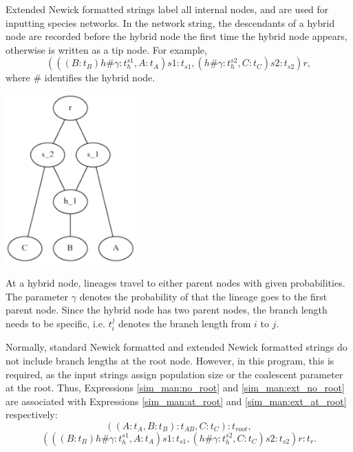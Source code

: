 Extended Newick formatted strings \citep{Cardona12008,Huson2010} label all internal
nodes, and are used for inputting species networks. In the network string, the descendants of a hybrid node are recorded before the hybrid node the first time the hybrid node appears, otherwise is written as a tip node. For example,
\begin{equation}
(((B:t_B)h\#\gamma:t^{s1}_{h},A:t_A)s1:t_{s1},(h\#\gamma:t^{s2}_{h},C:t_{C})s2:t_{s2})r,\label{sim_man:ext_no_root}
\end{equation}
where $\#$ identifies the hybrid node.
\begin{center}
\includegraphics[height=6.5cm]{net_eg.pdf}
\end{center}
At a hybrid node, lineages travel to either parent nodes with given probabilities. The parameter $\gamma$ denotes the probability of that the lineage goes to the first parent node.
Since the hybrid node has two parent nodes, the branch length needs to be specific, i.e. $t_{i}^j$ denotes the branch length from $i$ to $j$.

Normally, standard Newick formatted and extended Newick formatted strings do not include branch lengths at the root node. However, in this program, this is required, as the input strings assign population size or the coalescent parameter at the root. Thus, Expressions \eqref{sim_man:no_root} and \eqref{sim_man:ext_no_root} are associated with Expressions \eqref{sim_man:at_root} and \eqref{sim_man:ext_at_root} respectively:
\begin{equation}
((A:t_A,B:t_B):t_{AB},C:t_C):t_{root}\label{sim_man:at_root},
\end{equation}
\begin{equation}
(((B:t_B)h\#\gamma:t^{s1}_{h},A:t_A)s1:t_{s1},(h\#\gamma:t^{s2}_{h},C:t_{C})s2:t_{s2})r:t_r.\label{sim_man:ext_at_root}
\end{equation}




